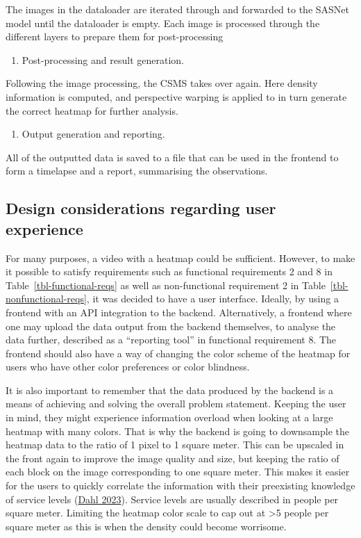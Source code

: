 \documentclass[
]{article}
\providecommand{\tightlist}{%
  \setlength{\itemsep}{0pt}\setlength{\parskip}{0pt}}\usepackage{longtable,booktabs,array}
\begin{document}
The images in the dataloader are iterated through and forwarded to the
SASNet model until the dataloader is empty. Each image is processed
through the different layers to prepare them for post-processing

\begin{enumerate}
\def\labelenumi{\arabic{enumi}.}
\setcounter{enumi}{4}
\tightlist
\item
  Post-processing and result generation.
\end{enumerate}

Following the image processing, the CSMS takes over again. Here density
information is computed, and perspective warping is applied to in turn
generate the correct heatmap for further analysis.

\begin{enumerate}
\def\labelenumi{\arabic{enumi}.}
\setcounter{enumi}{5}
\tightlist
\item
  Output generation and reporting.
\end{enumerate}

All of the outputted data is saved to a file that can be used in the
frontend to form a timelapse and a report, summarising the observations.

\hypertarget{sec-ux}{%
\subsection{Design considerations regarding user
experience}\label{sec-ux}}

For many purposes, a video with a heatmap could be sufficient. However,
to make it possible to satisfy requirements such as functional
requirements 2 and 8 in Table~\ref{tbl-functional-reqs} as well as
non-functional requirement 2 in Table~\ref{tbl-nonfunctional-reqs}, it
was decided to have a user interface. Ideally, by using a frontend with
an API integration to the backend. Alternatively, a frontend where one
may upload the data output from the backend themselves, to analyse the
data further, described as a ``reporting tool'' in functional
requirement 8. The frontend should also have a way of changing the color
scheme of the heatmap for users who have other color preferences or
color blindness.

It is also important to remember that the data produced by the backend
is a means of achieving and solving the overall problem statement.
Keeping the user in mind, they might experience information overload
when looking at a large heatmap with many colors. That is why the
backend is going to downsample the heatmap data to the ratio of 1 pixel
to 1 square meter. This can be upscaled in the front again to improve
the image quality and size, but keeping the ratio of each block on the
image corresponding to one square meter. This makes it easier for the
users to quickly correlate the information with their preexisting
knowledge of service levels (\protect\hyperlink{ref-dahl2023crowd}{Dahl
2023}). Service levels are usually described in people per square meter.
Limiting the heatmap color scale to cap out at \textgreater5 people per
square meter as this is when the density could become worrisome.
\end{document}

